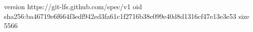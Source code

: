 version https://git-lfs.github.com/spec/v1
oid sha256:ba46719e6f664f3edf942ed3fa61c1f2716b38e099e40d8d1316cf47e13e3e53
size 5566
